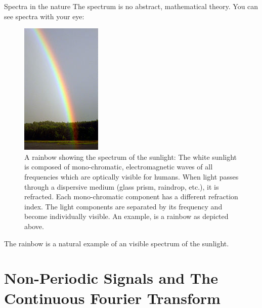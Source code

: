 \begin{refsection}
\begin{excursus}{Spectra in the nature}
	The spectrum is no abstract, mathematical theory. You can see spectra with your eye:
	\begin{figure}[H]
		\centering
		\includegraphics[scale=1]{../chapter02/Rainbow.jpg}
		\caption[A rainbow showing the spectrum of the sunlight]{A rainbow showing the spectrum of the sunlight: The white sunlight is composed of mono-chromatic, electromagnetic waves of all frequencies which are optically visible for humans. When light passes through a dispersive medium (glass prism, raindrop, etc.), it is refracted. Each mono-chromatic component has a different refraction index. The light components are separated by its frequency and become individually visible. An example, is a rainbow as depicted above. }
	\end{figure}
	The rainbow is a natural example of an visible spectrum of the sunlight.
\end{excursus}

\section{Non-Periodic Signals and The Continuous Fourier Transform}


\end{refsection}
